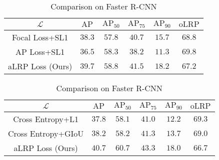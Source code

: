 \documentclass{article}
\begin{document}
\begin{table}[]
\RawFloats
\parbox{.48\linewidth}{
    \centering
    \setlength{\tabcolsep}{0.15em}
    \footnotesize
    \caption{Comparison on FoveaBox \cite{FoveaBox}.}
    \label{tab:anchorfree}
    \begin{tabular}{|c|c|c|c|c|c|} \hline
    $\mathcal{L}$&$\mathrm{AP}$&$\mathrm{AP_{50}}$&$\mathrm{AP_{75}}$&$\mathrm{AP_{90}}$&$\mathrm{oLRP}$ \\ \hline
    Focal Loss+SL1&$38.3$&$57.8$&$40.7$&$15.7$&$68.8$\\ \hline
    AP Loss+SL1&$36.5$&$58.3$&$38.2$&$11.3$&$69.8$\\ \hline
    aLRP Loss (Ours)&$\mathbf{39.7}$&$\mathbf{58.8}$&$\mathbf{41.5}$&$\mathbf{18.2}$&$\mathbf{67.2}$\\ \hline
    \end{tabular}
}
\hfill
\parbox{.52\linewidth}{
    \centering
    \setlength{\tabcolsep}{0.15em}
    \footnotesize
    \caption{Comparison on Faster R-CNN \cite{FasterRCNN}}
    \label{tab:twostage}
    \begin{tabular}{|c|c|c|c|c|c|} \hline
    $\mathcal{L}$&$\mathrm{AP}$&$\mathrm{AP_{50}}$&$\mathrm{AP_{75}}$&$\mathrm{AP_{90}}$&$\mathrm{oLRP}$ \\ \hline
    Cross Entropy+L1&$37.8$&$58.1$&$41.0$&$12.2$&$69.3$\\ \hline
    Cross Entropy+GIoU&$38.2$&$58.2$&$41.3$&$13.7$&$69.0$\\ \hline
aLRP Loss (Ours)&$\mathbf{40.7}$&$\mathbf{60.7}$&$\mathbf{43.3}$&$\mathbf{18.0}$&$\mathbf{66.7}$\\ \hline
    \end{tabular}
}
\end{table}
\end{document}

